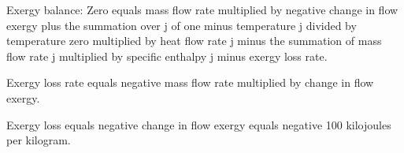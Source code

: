 Exergy balance:  
Zero equals mass flow rate multiplied by negative change in flow exergy plus the summation over j of one minus temperature j divided by temperature zero multiplied by heat flow rate j minus the summation of mass flow rate j multiplied by specific enthalpy j minus exergy loss rate.  

Exergy loss rate equals negative mass flow rate multiplied by change in flow exergy.  

Exergy loss equals negative change in flow exergy equals negative 100 kilojoules per kilogram.